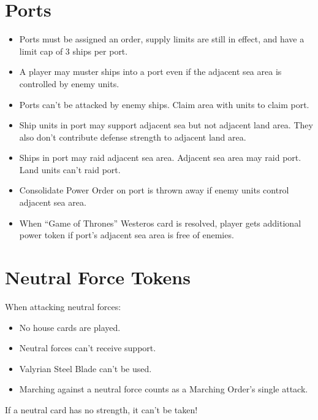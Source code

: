 \documentclass[12pt]{article}
\newenvironment{itemizeCustom}
{\begin{itemize}
  \setlength{\itemsep}{1pt}
  \setlength{\parskip}{0pt}
  \setlength{\parsep}{0pt}}
{\end{itemize}}
\begin{document}
\begin{multicols*}{2}
\section*{Ports}
\begin{itemizeCustom}
	\item Ports must be assigned an order, supply limits are still in effect, and have a limit cap of 3 ships per port.
	\item A player may muster ships into a port even if the adjacent sea area is controlled by enemy units.
	\item Ports can't be attacked by enemy ships. Claim area with units to claim port.
	\item Ship units in port may support adjacent sea but not adjacent land area. They also don't contribute defense strength to adjacent land area.
	\item Ships in port may raid adjacent sea area. Adjacent sea area may raid port. Land units can't raid port.
	\item Consolidate Power Order on port is thrown away if enemy units control adjacent sea area.
	\item When ``Game of Thrones'' Westeros card is resolved, player gets additional power token if port's adjacent sea area is free of enemies. 
\end{itemizeCustom}

\section*{Neutral Force Tokens}
When attacking neutral forces:
\begin{itemizeCustom}
	\item No house cards are played.
	\item Neutral forces can't receive support.
	\item Valyrian Steel Blade can't be used.
	\item Marching against a neutral force counts as a Marching Order's single attack.
\end{itemizeCustom}
If a neutral card has no strength, it can't be taken!

\end{multicols*}
\end{document}

